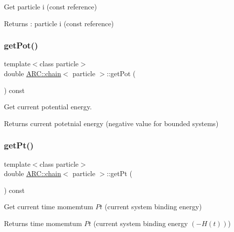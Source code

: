 Get particle i (const reference) 

\begin{DoxyReturn}{Returns}
\+: particle i (const reference) 
\end{DoxyReturn}
\hypertarget{classARC_1_1chain_ae59c00c676af34f22c650076eb0aa83a}{}\label{classARC_1_1chain_ae59c00c676af34f22c650076eb0aa83a} 
\subsubsection{\texorpdfstring{get\+Pot()}{getPot()}}
{\footnotesize\ttfamily template$<$class particle$>$ \\
double \hyperlink{classARC_1_1chain}{A\+R\+C\+::chain}$<$ particle $>$\+::get\+Pot (\begin{DoxyParamCaption}{ }\end{DoxyParamCaption}) const\hspace{0.3cm}{\ttfamily [inline]}}



Get current potential energy. 

\begin{DoxyReturn}{Returns}
current potetnial energy (negative value for bounded systems) 
\end{DoxyReturn}
\hypertarget{classARC_1_1chain_adbda281b80afe23f4b23d6a775046121}{}\label{classARC_1_1chain_adbda281b80afe23f4b23d6a775046121} 
\subsubsection{\texorpdfstring{get\+Pt()}{getPt()}}
{\footnotesize\ttfamily template$<$class particle$>$ \\
double \hyperlink{classARC_1_1chain}{A\+R\+C\+::chain}$<$ particle $>$\+::get\+Pt (\begin{DoxyParamCaption}{ }\end{DoxyParamCaption}) const\hspace{0.3cm}{\ttfamily [inline]}}



Get current time momemtum $Pt$ (current system binding energy) 

\begin{DoxyReturn}{Returns}
time momemtum $Pt$ (current system binding energy $(-H(t))$) 
\end{DoxyReturn}
\hypertarget{classARC_1_1chain_a48bde99d89b99df54844e1331d4814bb}{}\label{classARC_1_1chain_a48bde99d89b99df54844e1331d4814bb} 
